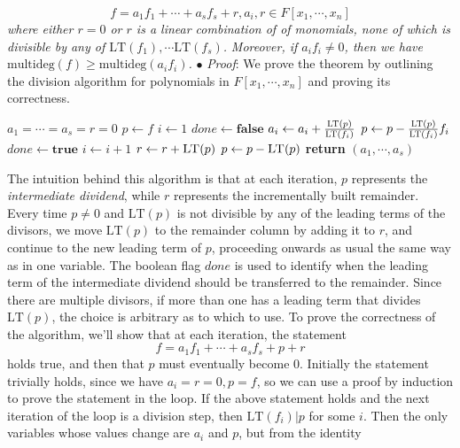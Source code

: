 \documentclass{article}
\begin{document}
$$ f = a_1 f_1 + \cdots + a_s f_s + r, a_i, r \in F[x_1, \cdots, x_n] $$
\indent \textit{where either $ r = 0 $ or $ r $ is a linear combination of of monomials, none of which is divisible by any of $ \text{LT}(f_1), \cdots \text{LT}(f_s) $.}
\newline
\indent \textit{Moreover, if $ a_i f_i \neq 0 $, then we have $ \text{multideg}(f) \geq \text{multideg}(a_i f_i) $.}
\newline
\indent $ \bullet $ \textit{Proof}: We prove the theorem by outlining the division algorithm for polynomials in $ F[x_1, \cdots, x_n] $ and proving its correctness.
\begin{algorithmic}
		\State $ a_1 = \cdots = a_s = r = 0 $
		\State $ p \gets f $
			\State $ i \gets 1 $
			\State $ done \gets \textbf{false} $
	 				\State $ a_i \gets a_i + \frac{\textproc{LT}(p)}{\textproc{LT}(f_i)} $
	 				\State $ p \gets p - \frac{\textproc{LT}(p)}{\textproc{LT}(f_i)} f_i $
	 				\State $ done \gets \textbf{true} $
	 			\Else
	 				\State $ i \gets i + 1 $
	 			\EndIf
			\EndWhile
				\State $ r \gets r + \textproc{LT}(p) $
				\State $ p \gets p - \textproc{LT}(p) $
			\EndIf
		\EndWhile
		\State \textbf{return} $ (a_1, \cdots, a_s) $
	\EndProcedure
\end{algorithmic}
The intuition behind this algorithm is that at each iteration, $ p $ represents the \textit{intermediate dividend}, while $ r $ represents the incrementally built remainder. Every time $ p \neq 0 $ and $ \text{LT}(p) $ is not divisible by any of the leading terms of the divisors, we move $ \text{LT}(p) $ to the remainder column by adding it to $ r $, and continue to the new leading term of $ p $, proceeding onwards as usual the same way as in one variable. The boolean flag $ done $ is used to identify when the leading term of the intermediate dividend should be transferred to the remainder. Since there are multiple divisors, if more than one has a leading term that divides $ \text{LT}(p) $, the choice is arbitrary as to which to use.
\newline
To prove the correctness of the algorithm, we'll show that at each iteration, the statement
$$ f = a_1 f_1 + \cdots + a_s f_s + p + r $$
holds true, and then that $ p $ must eventually become 0. Initially the statement trivially holds, since we have $ a_i = r = 0, p = f $, so we can use a proof by induction to prove the statement in the loop. If the above statement holds and the next iteration of the loop is a division step, then $ \text{LT}(f_i) | p $ for some $ i $. Then the only variables whose values change are $ a_i $ and $ p $, but from the identity
\end{document}
